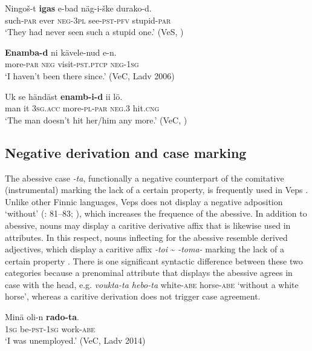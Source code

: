 \documentclass[output=paper,colorlinks=true, citecolor=brown]{langscibook}
\begin{document}
\ea
    \label{ex:vep:69}
    \gll  Ningoš{}-t  \textbf{igas} e{}-bad näg{}-i{}-ške durako{}-d.\\
         such-\textsc{par} ever \textsc{neg{}-3pl} see-\textsc{pst}{}-\textsc{pfv} stupid-\textsc{par}\\
    \glt ‘They had never seen such a stupid one.’ (VeS, \citealt[71]{Kettunen1920})
\z 

\ea
    \label{ex:vep:70}
    \gll \textbf{Enamba{}-d} ni kävele{}-nud e{}-n.\\
         more-\textsc{par} \textsc{neg} visit-\textsc{pst.ptcp} \textsc{neg-1sg}\\
    \glt ‘I haven’t been there since.’ (VeC, Ladv 2006)
\z 

\ea
    \label{ex:vep:71}
    \gll Uk se händäst \textbf{enamb{}-i{}-d} ii lö.\\
         man it \textsc{3sg}.\textsc{acc} more{}-\textsc{pl}{}-\textsc{par} \textsc{neg.3} hit.\textsc{cng} \\
    \glt ‘The man doesn’t hit her/him any more.’ (VeC, \citealt[40]{MSFOu70})
\z

\subsection{Negative derivation and case marking}\label{sec:vep:3.3}

The abessive case \textit{{}-ta}, functionally a negative counterpart of the comitative (instrumental) marking the lack of a certain property, is frequently used in Veps . Unlike other Finnic languages, Veps does not display a negative adposition ‘without’ (\citealt{Grünthal2003}: 81–83; \citealt{Pantermöller2007}), which increases the frequence of the abessive. In addition to abessive, nouns may display a caritive derivative affix that is likewise used in attributes. In this respect, nouns inflecting for the abessive resemble derived adjectives, which display a caritive affix \textit{{}-toi} {\textasciitilde} \textit{{}-toma-} marking the lack of a certain property . There is one significant syntactic difference between these two categories because a prenominal attribute that displays the abessive agrees in case with the head, e.g. \textit{voukta-ta hebo-ta} white-\textsc{abe} horse-\textsc{abe} ‘without a white horse’, whereas a caritive derivation does not trigger case agreement.

\ea\label{ex:vep:72}
    \gll Minä oli{}-n \textbf{rado{}-ta}.\\
         \textsc{1sg} be-\textsc{pst}{}-\textsc{1sg} work-\textsc{abe} \\
    \glt ‘I was unemployed.’ (VeC, Ladv 2014)
\z
\end{document}
